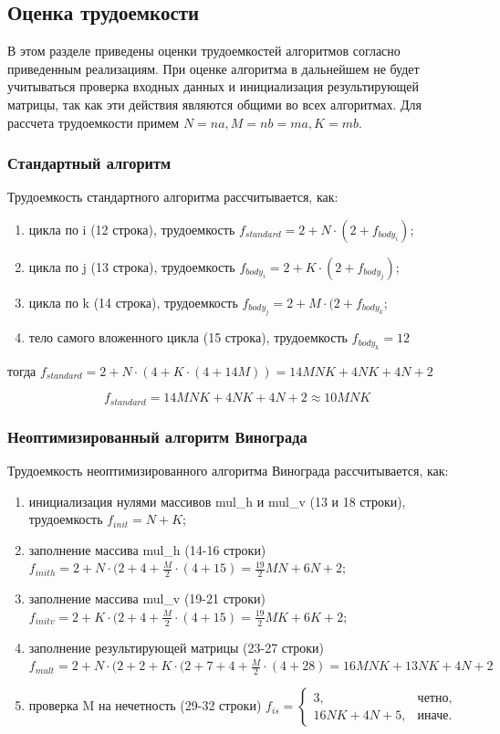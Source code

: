 \documentclass{article}
\begin{document}
\subsection{Оценка трудоемкости}
В этом разделе приведены оценки трудоемкостей алгоритмов согласно приведенным реализациям. При оценке алгоритма
в дальнейшем не будет учитываться проверка входных данных и инициализация результирующей матрицы, так как эти
действия являются общими во всех алгоритмах. Для рассчета трудоемкости примем $N = na, M = nb = ma, K = mb$.
\subsubsection{Стандартный алгоритм}
Трудоемкость стандартного алгоритма рассчитывается, как:
\begin{enumerate}
	\item цикла по i (12 строка), трудоемкость $f_{standard} = 2 + N \cdot (2 + f_{body_{i}})$;
	\item цикла по j (13 строка), трудоемкость $f_{body_{i}} = 2 + K \cdot (2 + f_{body_{j}})$;
	\item цикла по k (14 строка), трудоемкость $f_{body_{j}} = 2 + M \cdot (2 + f_{body_{k}}$;
	\item тело самого вложенного цикла (15 строка), трудоемкость $ f_{body_{k}} = 12$
\end{enumerate}
тогда $f_{standard} = 2 + N \cdot (4 + K \cdot (4 + 14M)) = 14MNK + 4NK + 4N + 2$

\begin{equation}
	\label{topic:standard}
	f_{standard} = 14MNK + 4NK + 4N + 2 \approx 10MNK
\end{equation}

\subsubsection{Неоптимизированный алгоритм Винограда}
Трудоемкость неоптимизированного алгоритма Винограда рассчитывается, как:
\begin{enumerate}
	\item инициализация нулями массивов mul\_h и mul\_v (13 и 18 строки), трудоемкость $f_{init} = N + K$;
	\item заполнение массива mul\_h (14-16 строки) $f_{inith} = 2 + N \cdot (2 + 4 + \frac{M}{2} \cdot (4 + 15) =
 \frac{19}{2}MN +6N + 2$;
	\item заполнение массива mul\_v (19-21 строки) $f_{initv} = 2 + K \cdot (2 + 4 + \frac{M}{2} \cdot (4 + 15) =
 \frac{19}{2}MK +6K + 2$;
	\item заполнение результирующей матрицы (23-27 строки) $f_{mult} = 2 + N \cdot (2 + 2 + K \cdot (2 + 7 + 4 + \frac{M}{2}
 \cdot (4 + 28) = 16MNK + 13NK +4N + 2$
 	\item проверка M на нечетность (29-32 строки) $f_{is} = \begin{cases} 3, & \text{четно,}\\
 													16NK + 4N + 5, & \text{иначе.}\end{cases}$
\end{enumerate}
\end{document}
